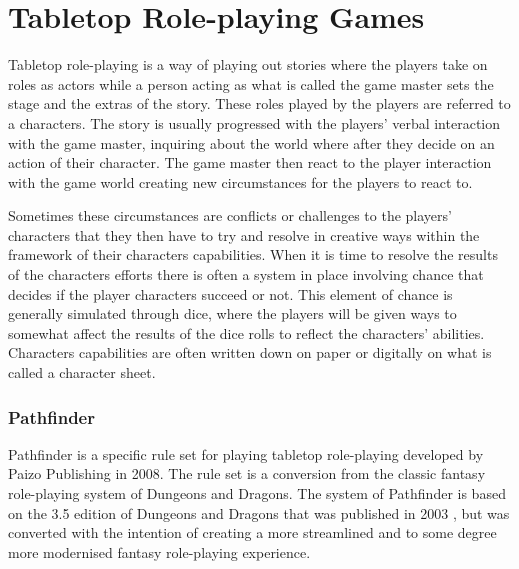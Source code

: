 \chapter*{Tabletop Role-playing Games}
Tabletop role-playing is a way of playing out stories where the players take on roles as actors while a person acting as what is called the game master sets the stage and the extras of the story. These roles played by the players are referred to a characters. The story is usually progressed with the players' verbal interaction with the game master, inquiring about the world where after they decide on an action of their character. The game master then react to the player interaction with the game world creating new circumstances for the players to react to. 

Sometimes these circumstances are conflicts or challenges to the players' characters that they then have to try and resolve in creative ways within the framework of their characters capabilities. When it is time to resolve the results of the characters efforts there is often a system in place involving chance that decides if the player characters succeed or not. This element of chance is generally simulated through dice, where the players will be given ways to somewhat affect the results of the dice rolls to reflect the characters' abilities. Characters capabilities are often written down on paper or digitally on what is called a character sheet.

\subsection*{Pathfinder}
Pathfinder is a specific rule set for playing tabletop role-playing developed by Paizo Publishing in 2008. The rule set is a conversion from the classic fantasy role-playing system of Dungeons and Dragons. The system of Pathfinder is based on the 3.5 edition of Dungeons and Dragons that was published in 2003 \cite{WotCtimeline}, but was converted with the intention of creating a more streamlined and to some degree more modernised fantasy role-playing experience. \cite{PaizoHome} \cite{PFcore}

